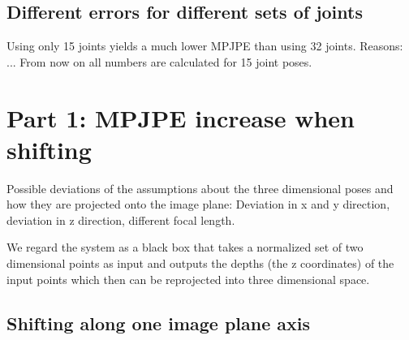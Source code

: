 \documentclass[11pt]{article}
\begin{document}
	\subsection{Different errors for different sets of joints}
		Using only 15 joints yields a much lower MPJPE than using 32 joints. Reasons: ...	
		From now on all numbers are calculated for 15 joint poses.
	\section{Part 1: MPJPE increase when shifting}
	
	Possible deviations of the assumptions about the three dimensional poses and how they are projected onto the image plane: Deviation in x and y direction, deviation in z direction, different focal length.
	
	We regard the system as a black box that takes a normalized set of two dimensional points as input and outputs the depths (the z coordinates) of the input points which then can be reprojected into three dimensional space.
	\subsection{Shifting along one image plane axis}
	\label{sec:x-shift-error}
\end{document}
